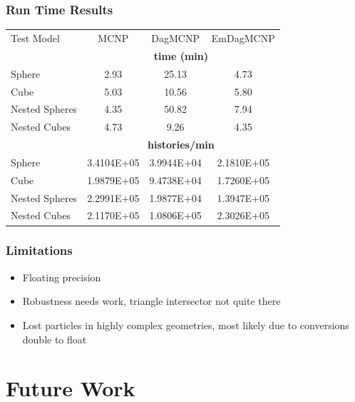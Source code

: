 \documentclass[12pt]{beamer}
\begin{document}
\begin{frame}
\frametitle{Run Time Results}

\begin{table}
  \small
  \begin{center}


      \label{timings}
    \begin{tabular}{lccc}



      \toprule
      Test Model & MCNP & DagMCNP & EmDagMCNP \\
      & \multicolumn{3}{c}{\textbf{time (min)}} \\
      \hline
      Sphere & 2.93 & 25.13 & 4.73  \\
      Cube & 5.03 & 10.56  & 5.80 \\
      Nested Spheres & 4.35 & 50.82 & 7.94 \\
      Nested Cubes & 4.73 & 9.26 & 4.35 \\
      &  \multicolumn{3}{c}{\textbf{histories/min}} \\
      \hline
      Sphere & 3.4104E+05  & 3.9944E+04  & 2.1810E+05   \\
      Cube & 1.9879E+05 & 9.4738E+04 & 1.7260E+05 \\
      Nested Spheres & 2.2991E+05 & 1.9877E+04 & 1.3947E+05 \\
      Nested Cubes & 2.1170E+05 & 1.0806E+05 & 2.3026E+05 \\
      \bottomrule
      
    \end{tabular}
  \end{center}
\end{table}



\end{frame}

\begin{frame}
\frametitle{Limitations}
\begin{itemize}
\item Floating precision 
\item Robustness needs work, triangle intersector not quite there
\item Lost particles in highly complex geometries, most likely due to conversions double to float
\end{itemize}
\end{frame}

\section{Future Work} %
\end{document}
